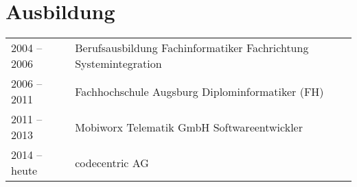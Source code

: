 \section*{Ausbildung}
\begin{tabular}{@{}p{6cm}p{10cm}}
2004 -- 2006	& Berufsausbildung Fachinformatiker
	Fachrichtung Systemintegration\\
2006 -- 2011	& Fachhochschule Augsburg
	Diplominformatiker (FH)\\
2011 -- 2013	& Mobiworx Telematik GmbH
	Softwareentwickler\\
2014 -- heute	& codecentric AG
\end{tabular}
